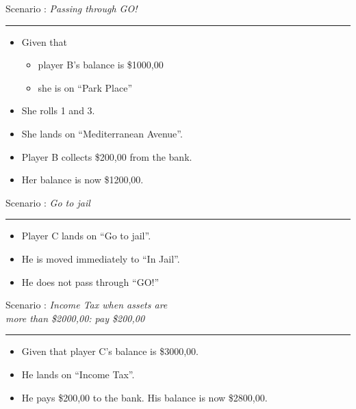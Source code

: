 \documentclass[handout,t,12pt]{beamer}
\newcommand{\Square}[1]{``#1''}
\newcommand{\money}[1]{\$#1,00}
\newcounter{scenarioid}\setcounter{scenarioid}{0}
\newenvironment{scenario}[1]{%
\addtocounter{scenarioid}{1} 
{\Large Scenario \thescenarioid: \emph{#1}\\[3px]\hrule}
\vspace{1\bigskipamount}
}{%
}
\begin{document}
  \begin{frame}
    \begin{scenario}{Passing through GO!}
      \begin{itemize}
        \item Given that 
        \begin{itemize}
          \item player B's balance is \money{1000}
          \item she is on \Square{Park Place}          
        \end{itemize}
        \item She rolls 1 and 3.
        \item She lands on \Square{Mediterranean Avenue}.
        \item Player B collects \money{200} from the bank.
        \item Her balance is now \money{1200}.
      \end{itemize}
      
    \end{scenario}
  \end{frame}

  \begin{frame}
    \begin{scenario}{Go to jail}
      \begin{itemize}
        \item Player C lands on \Square{Go to jail}.
        \item He is moved immediately to \Square{In Jail}.
        \item He does not pass through \Square{GO!}
      \end{itemize}
    \end{scenario}
  \end{frame}
  

  \begin{frame}
    \begin{scenario}{Income Tax when assets are\\more than \money{2000}: pay \money{200}}
      \begin{itemize}
        \item Given that player C's balance is \money{3000}.
        \item He lands on \Square{Income Tax}.
        \item He pays \money{200} to the bank.  His balance is now \money{2800}.
      \end{itemize}
    \end{scenario}
  \end{frame}
\end{document}

